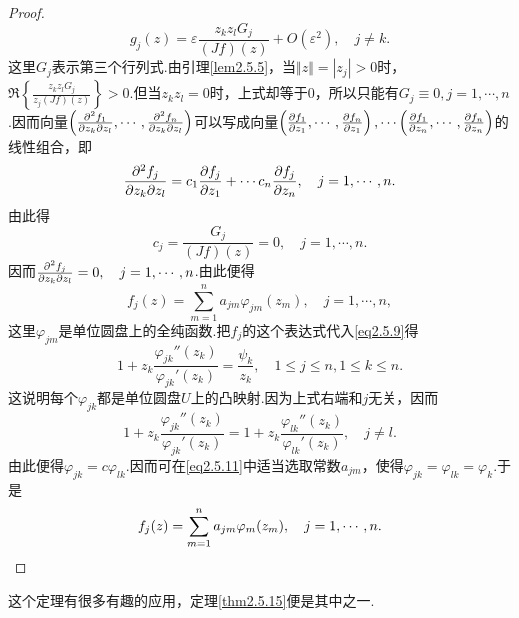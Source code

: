 \begin{proof}
\[g_j(z)=\varepsilon\frac{z_k z_l G_j}{(Jf)(z)}+O(\varepsilon^2),\quad j\neq k.\]
这里$G_j$表示第三个行列式.由引理\ref{lem2.5.5}，当$\Vert z\Vert=|z_j|>0$时，$\Re\left\{\frac{z_kz_lG_j}{z_j(Jf)(z)}\right\}>0$.但当$z_kz_l=0$时，上式却等于$0$，所以只能有$G_j\equiv0,j=1,\cdots,n$.因而向量$\left(\frac{\partial^2 f_1}{\partial z_k\partial z_l},\cdots,\frac{\partial^2 f_n}{\partial z_k\partial z_l}\right)$可以写成向量$\left(\frac{\partial f_1}{\partial z_1},\cdots,\frac{\partial f_n}{\partial z_1}\right),\cdots\left(\frac{\partial f_1}{\partial z_n},\cdots,\frac{\partial f_n}{\partial z_n}\right)$的线性组合，即
\[\frac{\partial^2 f_j}{\partial z_k\partial z_l}=c_1\frac{\partial f_j}{\partial z_1}+\cdots c_n\frac{\partial f_j}{\partial z_n},\quad j=1,\cdots,n.\]
由此得
\[c_j=\frac{G_j}{(Jf)(z)}=0,\quad j=1,\cdots,n.\]
因而$\frac{\partial^2 f_j}{\partial z_k\partial z_l}=0,\quad j=1,\cdots,n$.由此便得
\begin{equation}\label{eq2.5.11}
	f_j(z)=\sum_{m=1}^{n}a_{jm}\varphi_{jm}(z_m),\quad j=1,\cdots,n,
\end{equation}
这里$\varphi_{jm}$是单位圆盘上的全纯函数.把$f_j$的这个表达式代入\eqref{eq2.5.9}得
\begin{equation}\label{eq2.5.12}
	1+z_k\frac{\varphi_{jk}''(z_k)}{\varphi_{jk}'(z_k)}=\frac{\psi_k}{z_k},\quad 1\le j\le n,1\le k\le n.
\end{equation}
这说明每个$\varphi_{jk}$都是单位圆盘$U$上的凸映射.因为上式右端和$j$无关，因而
\[1+z_k\frac{\varphi_{jk}''(z_k)}{\varphi_{jk}'(z_k)}=1+z_k \frac{\varphi_{lk}''(z_k)}{\varphi_{lk}'(z_k)},\quad j\neq l.\]
由此便得$\varphi_{jk}=c\varphi_{lk}$.因而可在\eqref{eq2.5.11}中适当选取常数$a_{jm}$，使得$\varphi_{jk}=\varphi_{lk}=\varphi_k$.于是
\[f_j(z)=\sum_{m=1}^{n}a_{jm}\varphi_m(z_m),\quad j=1,\cdots,n.\qedhere\]
\end{proof}
这个定理有很多有趣的应用，定理\ref{thm2.5.15}便是其中之一.
